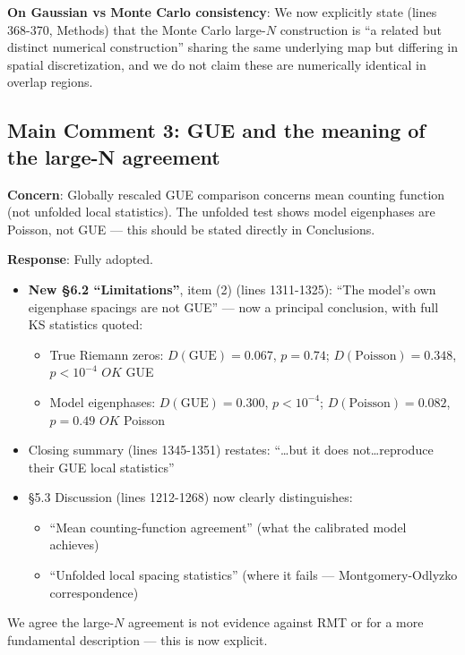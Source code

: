 \documentclass[11pt]{article}
\begin{document}
\textbf{On Gaussian vs Monte Carlo consistency}: We now explicitly state (lines 368-370, Methods) that the Monte Carlo large-$N$ construction is ``a related but distinct numerical construction'' sharing the same underlying map but differing in spatial discretization, and we do not claim these are numerically identical in overlap regions.

\subsection*{Main Comment 3: GUE and the meaning of the large-N agreement}

\textbf{Concern}: Globally rescaled GUE comparison concerns mean counting function (not unfolded local statistics). The unfolded test shows model eigenphases are Poisson, not GUE --- this should be stated directly in Conclusions.

\textbf{Response}: Fully adopted.

\begin{itemize}[leftmargin=2em]
\item \textbf{New \S6.2 ``Limitations''}, item (2) (lines 1311-1325): ``The model's own eigenphase spacings are not GUE'' --- now a principal conclusion, with full KS statistics quoted:
\begin{itemize}
\item True Riemann zeros: $D(\text{GUE})=0.067$, $p=0.74$; $D(\text{Poisson})=0.348$, $p<10^{-4}$ $OK$ GUE
\item Model eigenphases: $D(\text{GUE})=0.300$, $p<10^{-4}$; $D(\text{Poisson})=0.082$, $p=0.49$ $OK$ Poisson
\end{itemize}
\item Closing summary (lines 1345-1351) restates: ``\ldots but it does not\ldots reproduce their GUE local statistics''
\item \S5.3 Discussion (lines 1212-1268) now clearly distinguishes:
\begin{itemize}
\item ``Mean counting-function agreement'' (what the calibrated model achieves)
\item ``Unfolded local spacing statistics'' (where it fails --- Montgomery-Odlyzko correspondence)
\end{itemize}
\end{itemize}

We agree the large-$N$ agreement is not evidence against RMT or for a more fundamental description --- this is now explicit.
\end{document}
